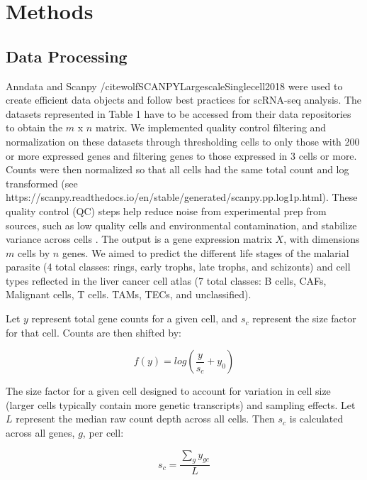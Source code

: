 \documentclass{article}
\begin{document}
\section{Methods}
\subsection{Data Processing}

Anndata \cite{virshupAnndataAnnotatedData2021} and Scanpy /cite{wolfSCANPYLargescaleSinglecell2018} were used to create efficient data objects and  follow best practices for scRNA-seq analysis. The datasets represented in Table 1 have to be accessed from their data repositories to obtain the $m$ x $n$ matrix. We implemented quality control filtering and normalization on these datasets through thresholding cells to only those with 200 or more expressed genes and filtering genes to those expressed in 3 cells or more. Counts were then normalized so that all cells had the same total count and log transformed (see https://scanpy.readthedocs.io/en/stable/generated/scanpy.pp.log1p.html). These quality control (QC) steps help reduce noise from experimental prep from sources, such as low quality cells and environmental contamination, and stabilize variance across cells \cite{heumosBestPracticesSinglecell2023}. The output is a gene expression matrix $X$, with dimensions $m$ cells by $n$ genes. We aimed to predict the different life stages of the malarial parasite (4 total classes: rings, early trophs, late trophs, and schizonts) and cell types reflected in the liver cancer cell atlas (7 total classes: B cells, CAFs, Malignant cells, T cells. TAMs, TECs, and unclassified).

Let \(y\) represent total gene counts for a given cell, and \(s_c\) represent the size factor for that cell. Counts are then shifted by:

\begin{displaymath}
f(y) = log\left(\frac{y}{s_c} + y_0 \right)
\end{displaymath}

The size factor for a given cell designed to account for variation in cell size (larger cells typically contain more genetic transcripts) and sampling effects. Let \(L\) represent the median raw count depth across all cells. Then \(s_c\) is calculated across all genes, \(g\), per cell: 

\begin{displaymath}
s_c = \frac{\sum_g y_{gc}}{L}
\end{displaymath}
\end{document}
